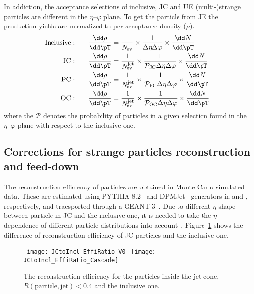 In addiction, the acceptance selections of inclusive, JC and UE (multi-)strange particles are different in the $\eta$--$\varphi$ plane. To get the particle from JE the production yields are normalized to per-acceptance density ($\rho$).
\begin{equation}
\begin{split}
{\rm Inclusive:}\qquad & \frac{\dd\rho}{\dd\pT} = \frac{1}{N_{\rm ev}}\times\frac{1}{\Delta\eta\Delta\varphi}\times\frac{\dd N}{\dd\pT} \\
{\rm JC:}\qquad & \frac{\dd\rho}{\dd\pT} = \frac{1}{N_{\rm ev}^{\rm jet}} \times\frac{1}{\mathcal{P}_{\rm JC}\Delta\eta\Delta\varphi}\times\frac{\dd N}{\dd\pT} \\
{\rm PC:}\qquad & \frac{\dd\rho}{\dd\pT} = \frac{1}{N_{\rm ev}^{\rm jet}} \times\frac{1}{\mathcal{P}_{\rm PC}\Delta\eta\Delta\varphi}\times\frac{\dd N}{\dd\pT} \\
{\rm OC:}\qquad & \frac{\dd\rho}{\dd\pT} = \frac{1}{N_{\rm ev}^{\rm jet}} \times\frac{1}{\mathcal{P}_{\rm OC}\Delta\eta\Delta\varphi}\times\frac{\dd N}{\dd\pT} \\
\end{split}
\end{equation}
where the $\mathcal{P}$ denotes the probability of particles in a given selection found in the $\eta$--$\varphi$ plane with respect to the inclusive one.

\subsection{Corrections for strange particles reconstruction and feed-down}
\label{SubSec:Correction}
The reconstruction efficiency of particles are obtained in Monte Carlo simulated data. These are estimated using PYTHIA 8.2~\cite{Sjostrand:2014zea} and DPMJet~\cite{Roesler:2000he} generators in \pp and \pPb, respectively, and tracsported through a GEANT 3~\cite{Brun:1994aa}. Due to different $\eta$-shape between particle in JC and the inclusive one, it is needed to take the $\eta$ dependence of different particle distributions into account~\cite{V0injet}. Figure~\ref{Fig:EffiJCIncl} shows the difference of reconstruction efficiency of JC particles and the inclusive one. 
\begin{figure}[!ht]
	\begin{center}
		\texttt{[image: JCtoIncl\_EffiRatio\_V0]}
		\texttt{[image: JCtoIncl\_EffiRatio\_Cascade]}
	\end{center}
	\caption{The reconstruction efficiency for the particles inside the jet cone, $R(\mathrm{particle, jet}) < 0.4$ and the inclusive one.}
	\label{Fig:EffiJCIncl}
\end{figure}

